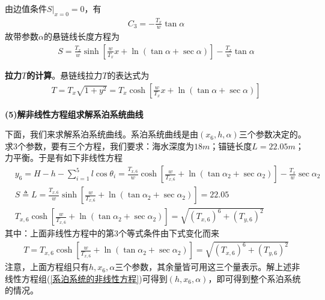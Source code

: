 \documentclass[UTF8]{ctexbook}
\theoremstyle{nonumberplain}
\begin{document}
            由边值条件$S|_{x=0}=0$，有
            \begin{align*}
            C_3=-\frac{T_x}{w}\tan\alpha
            \end{align*}
            故带参数$\alpha$的悬链线长度方程为
            \begin{align*}
            S = \frac{T_x}{w}\sinh\left[ \frac{w}{T_x}x+\ln (\tan\alpha+\sec\alpha) \right]-\frac{T_x}{w}\tan\alpha
            \end{align*}
            \par
            \textbf{拉力$T$的计算}。悬链线拉力$T$的表达式为
            \begin{align*}
            T=T_x\sqrt{1+y^2}=T_x\cosh\left[ \frac{w}{T_x}x+\ln (\tan\alpha+\sec\alpha) \right]
            \end{align*}
            \par
            \textbf{(5)解非线性方程组求解系泊系统曲线}
            \par
            下面，我们来求解系泊系统曲线。系泊系统曲线是由$(x_6,h,\alpha)$三个参数决定的。求3个参数，要有三个方程，我们要求：海水深度为$18m$；锚链长度$L=22.05m$；力平衡。于是有如下非线性方程
            \begin{align}
            \label{系泊系统的非线性方程}
            &y_6  = H-h-\sum_{i=1}^5l\cos\theta_i=\frac{T_{x,6}}{w}\cosh\left[ \frac{w}{T_{x,6}}+\ln (\tan\alpha_2+\sec\alpha_2) \right]-\frac{T_x}{w}\sec\alpha_2\\
            &S \triangleq L = \frac{T_{x,6}}{w}\sinh\left[ \frac{w}{T_{x,6}}+\ln (\tan\alpha_2+\sec\alpha_2) \right]=22.05\\
            &T_{x,6}\cosh \left[\frac{w}{T_{x,6}}+\ln (\tan\alpha_2+\sec\alpha_2)\right]  = \sqrt{(T_{x,6})^6+(T_{y,6})^2}
            \end{align}
            其中：上面非线性方程中的第3个等式条件由下式变化而来
            \begin{align*}
            T = T_{x,6}\cosh\left[\frac{w}{T_{x,6}}+\ln (\tan\alpha_2+\sec\alpha_2)\right] = \sqrt{(T_{x,6})^6+(T_{y,6})^2}
            \end{align*}
            注意，上面方程组只有$h,x_6,\alpha$三个参数，其余量皆可用这三个量表示。解上述非线性方程组(\ref{系泊系统的非线性方程})可得到$(h,x_6,\alpha)$，即可得到整个系泊系统的情况。
\end{document}
